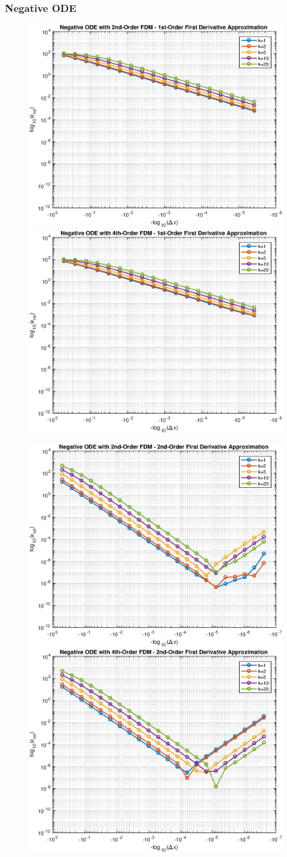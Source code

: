 \documentclass[10pt, reqno]{article}		%
\numberwithin{equation}{section}
\begin{document}
\newpage

\subsubsection{Negative ODE}

\begin{figure}[H]
	\begin{center}
		\includegraphics[width=0.46\linewidth]{negative_ode_order_2_fd_order_1}
		\includegraphics[width=0.46\linewidth]{negative_ode_order_4_fd_order_1}
	\end{center}
\end{figure}

\begin{figure}[H]
	\begin{center}
		\includegraphics[width=0.46\linewidth]{negative_ode_order_2_fd_order_2}
		\includegraphics[width=0.46\linewidth]{negative_ode_order_4_fd_order_2}
	\end{center}
\end{figure}
\end{document}
